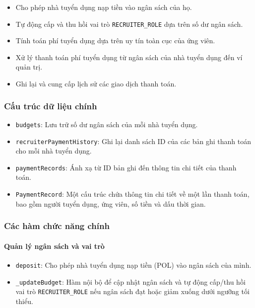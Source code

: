 \begin{itemize}
  \item Cho phép nhà tuyển dụng nạp tiền vào ngân sách của họ.
  \item Tự động cấp và thu hồi vai trò \texttt{RECRUITER\_ROLE} dựa trên số dư ngân sách.
  \item Tính toán phí tuyển dụng dựa trên uy tín toàn cục của ứng viên.
  \item Xử lý thanh toán phí tuyển dụng từ ngân sách của nhà tuyển dụng đến ví quản trị.
  \item Ghi lại và cung cấp lịch sử các giao dịch thanh toán.
\end{itemize}

\subsubsection{Cấu trúc dữ liệu chính}

\begin{itemize}
  \item \texttt{budgets}: Lưu trữ số dư ngân sách của mỗi nhà tuyển dụng.
  \item \texttt{recruiterPaymentHistory}: Ghi lại danh sách ID của các bản ghi thanh toán cho mỗi nhà tuyển dụng.
  \item \texttt{paymentRecords}: Ánh xạ từ ID bản ghi đến thông tin chi tiết của thanh toán.
  \item \texttt{PaymentRecord}: Một cấu trúc chứa thông tin chi tiết về một lần thanh toán, bao gồm người tuyển dụng, ứng viên, số tiền và dấu thời gian.
\end{itemize}

\subsubsection{Các hàm chức năng chính}

\paragraph{Quản lý ngân sách và vai trò}

\begin{itemize}
  \item \texttt{deposit}: Cho phép nhà tuyển dụng nạp tiền (POL) vào ngân sách của mình.
  \item \texttt{\_updateBudget}: Hàm nội bộ để cập nhật ngân sách và tự động cấp/thu hồi vai trò \texttt{RECRUITER\_ROLE} nếu ngân sách đạt hoặc giảm xuống dưới ngưỡng tối thiểu.
\end{itemize}

